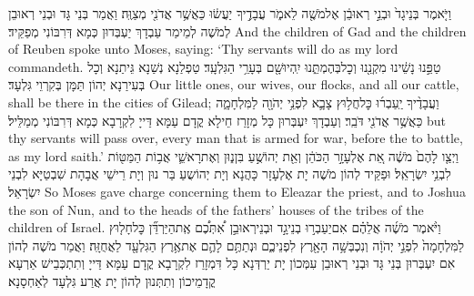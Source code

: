 {וַיֹּ֤אמֶר בְּנֵי\maqqaf גָד֙ וּבְנֵ֣י רְאוּבֵ֔ן אֶל\maqqaf מֹשֶׁ֖ה לֵאמֹ֑ר עֲבָדֶ֣יךָ יַעֲשׂ֔וּ כַּאֲשֶׁ֥ר אֲדֹנִ֖י מְצַוֶּֽה׃}
{וַאֲמַר בְּנֵי גָּד וּבְנֵי רְאוּבֵן לְמֹשֶׁה לְמֵימַר עַבְדָךְ יַעְבְּדוּן כְּמָא דְּרִבּוֹנִי מְפַקֵּיד׃}
{And the children of Gad and the children of Reuben spoke unto Moses, saying: ‘Thy servants will do as my lord commandeth.}{}
{טַפֵּ֣נוּ נָשֵׁ֔ינוּ מִקְנֵ֖נוּ וְכׇל\maqqaf בְּהֶמְתֵּ֑נוּ יִֽהְיוּ\maqqaf שָׁ֖ם בְּעָרֵ֥י הַגִּלְעָֽד׃}
{טַפְלַנָא נְשַׁנָא גֵּיתַנָא וְכָל בְּעִירַנָא יְהוֹן תַּמָּן בְּקִרְוֵי גִּלְעָד׃}
{Our little ones, our wives, our flocks, and all our cattle, shall be there in the cities of Gilead;}{}
{וַעֲבָדֶ֨יךָ יַֽעַבְר֜וּ כׇּל\maqqaf חֲל֥וּץ צָבָ֛א לִפְנֵ֥י יְהֹוָ֖ה לַמִּלְחָמָ֑ה כַּאֲשֶׁ֥ר אֲדֹנִ֖י דֹּבֵֽר׃}
{וְעַבְדָךְ יִעְבְּרוּן כָּל מְזָרַז חֵילָא קֳדָם עַמָּא דַּייָ לִקְרָבָא כְּמָא דְּרִבּוֹנִי מְמַלֵּיל׃}
{but thy servants will pass over, every man that is armed for war, before the \lord\space to battle, as my lord saith.’}{}
{וַיְצַ֤ו לָהֶם֙ מֹשֶׁ֔ה אֵ֚ת אֶלְעָזָ֣ר הַכֹּהֵ֔ן וְאֵ֖ת יְהוֹשֻׁ֣עַ בִּן\maqqaf נ֑וּן וְאֶת\maqqaf רָאשֵׁ֛י אֲב֥וֹת הַמַּטּ֖וֹת לִבְנֵ֥י יִשְׂרָאֵֽל׃}
{וּפַקֵּיד לְהוֹן מֹשֶׁה יָת אֶלְעָזָר כָּהֲנָא וְיָת יְהוֹשֻעַ בַּר נוּן וְיָת רֵישֵׁי אֲבָהָת שִׁבְטַיָּא לִבְנֵי יִשְׂרָאֵל׃}
{So Moses gave charge concerning them to Eleazar the priest, and to Joshua the son of Nun, and to the heads of the fathers’ houses of the tribes of the children of Israel.}{}
{וַיֹּ֨אמֶר מֹשֶׁ֜ה אֲלֵהֶ֗ם אִם\maqqaf יַעַבְר֣וּ בְנֵי\maqqaf גָ֣ד וּבְנֵי\maqqaf רְאוּבֵ֣ן \pasek  אִ֠תְּכֶ֠ם אֶֽת\maqqaf הַיַּרְדֵּ֞ן כׇּל\maqqaf חָל֤וּץ לַמִּלְחָמָה֙ לִפְנֵ֣י יְהֹוָ֔ה וְנִכְבְּשָׁ֥ה הָאָ֖רֶץ לִפְנֵיכֶ֑ם וּנְתַתֶּ֥ם לָהֶ֛ם אֶת\maqqaf אֶ֥רֶץ הַגִּלְעָ֖ד לַאֲחֻזָּֽה׃}
{וַאֲמַר מֹשֶׁה לְהוֹן אִם יִעְבְּרוּן בְּנֵי גָּד וּבְנֵי רְאוּבֵן עִמְּכוֹן יָת יַרְדְּנָא כָּל דִּמְזָרַז לִקְרָבָא קֳדָם עַמָּא דַּייָ וְתִתְכְּבֵישׁ אַרְעָא קֳדָמֵיכוֹן וְתִתְּנוּן לְהוֹן יָת אֲרַע גִּלְעָד לְאַחְסָנָא׃}
